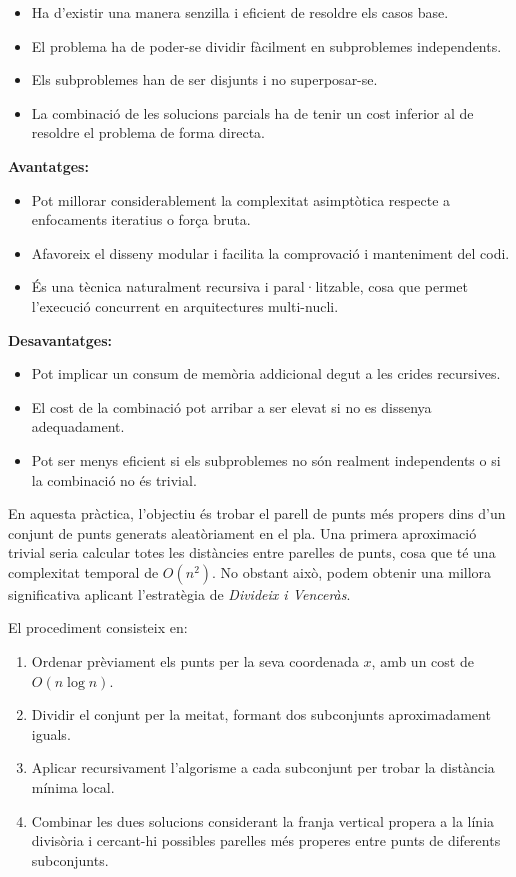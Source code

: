 \documentclass{ieeetj}
\begin{document}
\begin{itemize}
    \item Ha d’existir una manera senzilla i eficient de resoldre els casos base.
    \item El problema ha de poder-se dividir fàcilment en subproblemes independents.
    \item Els subproblemes han de ser disjunts i no superposar-se.
    \item La combinació de les solucions parcials ha de tenir un cost inferior al de resoldre el problema de forma directa.
\end{itemize}

\textbf{Avantatges:}
\begin{itemize}
    \item Pot millorar considerablement la complexitat asimptòtica respecte a enfocaments iteratius o força bruta.
    \item Afavoreix el disseny modular i facilita la comprovació i manteniment del codi.
    \item És una tècnica naturalment recursiva i paral·litzable, cosa que permet l'execució concurrent en arquitectures multi-nucli.
\end{itemize}

\textbf{Desavantatges:}
\begin{itemize}
    \item Pot implicar un consum de memòria addicional degut a les crides recursives.
    \item El cost de la combinació pot arribar a ser elevat si no es dissenya adequadament.
    \item Pot ser menys eficient si els subproblemes no són realment independents o si la combinació no és trivial.
\end{itemize}

En aquesta pràctica, l’objectiu és trobar el parell de punts més propers dins d’un conjunt de punts generats aleatòriament en el pla. Una primera aproximació trivial seria calcular totes les distàncies entre parelles de punts, cosa que té una complexitat temporal de \(O(n^2)\). No obstant això, podem obtenir una millora significativa aplicant l’estratègia de \textit{Divideix i Venceràs}.

El procediment consisteix en:
\begin{enumerate}
    \item Ordenar prèviament els punts per la seva coordenada \(x\), amb un cost de \(O(n \log n)\).
    \item Dividir el conjunt per la meitat, formant dos subconjunts aproximadament iguals.
    \item Aplicar recursivament l’algorisme a cada subconjunt per trobar la distància mínima local.
    \item Combinar les dues solucions considerant la franja vertical propera a la línia divisòria i cercant-hi possibles parelles més properes entre punts de diferents subconjunts.
\end{enumerate}
\end{document}
